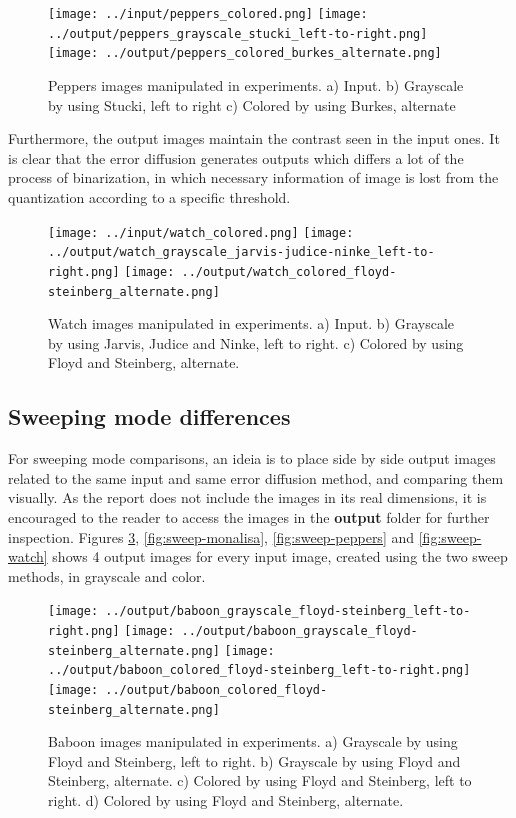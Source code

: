 \documentclass[]{IEEEtran}
\begin{document}
\begin{figure}[H]
  \centering
  \texttt{[image: ../input/peppers\_colored.png]}
  \texttt{[image: ../output/peppers\_grayscale\_stucki\_left-to-right.png]}
  \texttt{[image: ../output/peppers\_colored\_burkes\_alternate.png]}
  \caption{Peppers images manipulated in experiments. a) Input. b) Grayscale by using Stucki, left to right c) Colored by using Burkes, alternate }
  \label{fig:effect-peppers}
\end{figure}

Furthermore, the output images maintain the contrast seen in the input ones. It is clear that the error diffusion generates outputs which differs a lot of the process of binarization, in which necessary information of image is lost from the quantization according to a specific threshold. 

\begin{figure}[H]
  \centering
  \texttt{[image: ../input/watch\_colored.png]}
  \texttt{[image: ../output/watch\_grayscale\_jarvis-judice-ninke\_left-to-right.png]}
  \texttt{[image: ../output/watch\_colored\_floyd-steinberg\_alternate.png]}
  \caption{Watch images manipulated in experiments. a) Input. b) Grayscale by using Jarvis, Judice and Ninke, left to right. c) Colored by using Floyd and Steinberg, alternate. }
  \label{fig:effect-watch}
\end{figure}

\subsection{Sweeping mode differences}

For sweeping mode comparisons, an ideia is to place side by side output images related to the same input and same error diffusion method, and comparing them visually. As the report does not include the images in its real dimensions, it is encouraged to the reader to access the images in the \textbf{output} folder for further inspection. Figures \ref{fig:sweep-baboon}, \ref{fig:sweep-monalisa}, \ref{fig:sweep-peppers} and \ref{fig:sweep-watch} shows 4 output images for every input image, created using the two sweep methods, in grayscale and color.

\begin{figure}[H]
  \centering
  \texttt{[image: ../output/baboon\_grayscale\_floyd-steinberg\_left-to-right.png]}
  \texttt{[image: ../output/baboon\_grayscale\_floyd-steinberg\_alternate.png]}
  \texttt{[image: ../output/baboon\_colored\_floyd-steinberg\_left-to-right.png]}
  \texttt{[image: ../output/baboon\_colored\_floyd-steinberg\_alternate.png]}
  \caption{Baboon images manipulated in experiments. a) Grayscale by using Floyd and Steinberg, left to right. b) Grayscale by using Floyd and Steinberg, alternate. c) Colored by using Floyd and Steinberg, left to right. d) Colored by using Floyd and Steinberg, alternate.}
  \label{fig:sweep-baboon}
\end{figure}
\end{document}
